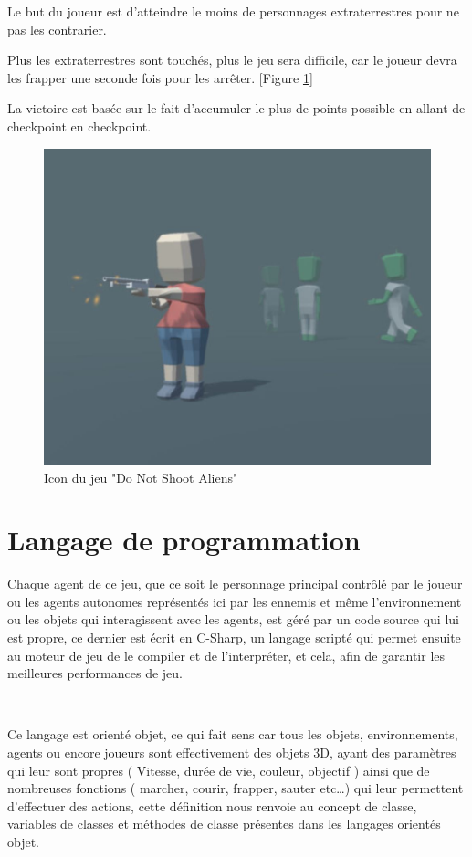 Le but du joueur est d’atteindre le moins de personnages extraterrestres pour ne pas les contrarier.

Plus les extraterrestres sont touchés, plus le jeu sera difficile, car le joueur devra les frapper une seconde fois pour les arrêter. [Figure \ref{fig:7.2}] 

La victoire est basée sur le fait d’accumuler le plus de points possible en allant de checkpoint en checkpoint.

\begin{figure}[th]
\centering
\includegraphics{Figures/72unity.JPG}
\decoRule
\caption[Icon du jeu "Do Not Shoot Aliens"]{Icon du jeu "Do Not Shoot Aliens"}
\label{fig:7.2}
\end{figure}

\section{Langage de programmation}

Chaque agent de ce jeu, que ce soit le personnage principal contrôlé par le joueur ou les agents autonomes représentés ici par les ennemis et même l’environnement ou les objets qui interagissent avec les agents, est géré par un code source qui lui est propre, ce dernier est écrit en C-Sharp, un langage scripté qui permet ensuite au moteur de jeu de le compiler et de l'interpréter, et cela, afin de garantir les meilleures performances de jeu.

~\par
Ce langage est orienté objet, ce qui fait sens car tous les objets, environnements, agents ou encore joueurs sont effectivement des objets 3D, ayant des paramètres qui leur sont propres ( Vitesse, durée de vie, couleur, objectif ) ainsi que de nombreuses fonctions ( marcher, courir, frapper, sauter etc…) qui leur permettent d’effectuer des actions, cette définition nous renvoie au concept de classe, variables de classes et méthodes de classe présentes dans les langages orientés objet.


